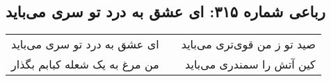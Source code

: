 \begin{center}
\section*{رباعی شماره ۳۱۵: ای عشق به درد تو سری می‌باید}
\label{sec:sh315}
\begin{longtable}{l p{0.5cm} r}
ای عشق به درد تو سری می‌باید
&&
صید تو ز من قوی‌تری می‌باید
\\
من مرغ به یک شعله کبابم بگذار
&&
کین آتش را سمندری می‌باید
\\
\end{longtable}
\end{center}
